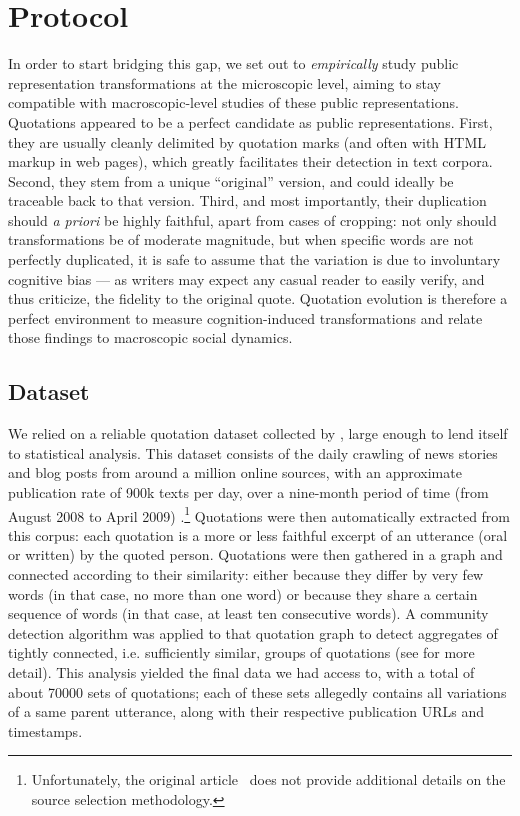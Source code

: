 \section{Protocol} %
\label{sec:protocol}

In order to start bridging this gap, we set out to \emph{empirically} study public representation transformations at the microscopic level, aiming to stay compatible with macroscopic-level studies of these public representations.
Quotations appeared to be a perfect candidate as public representations.
First, they are usually cleanly delimited by quotation marks (and often with HTML markup in web pages), which greatly facilitates their detection in text corpora.
Second, they stem from a unique ``original'' version, and could ideally be traceable back to that version.
Third, and most importantly, their duplication should \emph{a priori} be highly faithful, apart from cases of cropping: not only should transformations be of moderate magnitude, but when specific words are not perfectly duplicated, it is safe to assume that the variation is due to involuntary cognitive bias --- as writers may expect any casual reader to easily verify, and thus criticize, the fidelity to the original quote.
Quotation evolution is therefore a perfect environment to measure cognition-induced transformations and relate those findings to macroscopic social dynamics.

\subsection{Dataset}

We relied on a reliable quotation dataset collected by \citet{Leskovec09}, large enough to lend itself to statistical analysis.
This dataset consists of the daily crawling of news stories and blog posts from around a million online sources, with an approximate publication rate of 900k texts per day, over a nine-month period of time (from August 2008 to April 2009) \cite{Leskovec09-url}.\footnote{Unfortunately, the original article~\citep{Leskovec09} does not provide additional details on the source selection methodology.}
Quotations were then automatically extracted from this corpus: each quotation is a more or less faithful excerpt of an utterance (oral or written) by the quoted person.
Quotations were then gathered in a graph and connected according to their similarity: either because they differ by very few words (in that case, no more than one word) or because they share a certain sequence of words (in that case, at least ten consecutive words).
A community detection algorithm was applied to that quotation graph to detect aggregates of tightly connected, i.e. sufficiently similar, groups of quotations (see \citet{Leskovec09} for more detail).
This analysis yielded the final data we had access to, with a total of about \num{70000} sets of quotations; each of these sets allegedly contains all variations of a same parent utterance, along with their respective publication URLs and timestamps.

